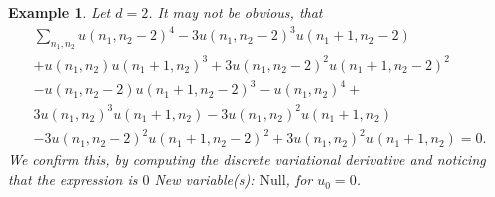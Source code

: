 \documentclass[sigconf,twocolumn]{acmart}
\newcommand{\1}{{\chi}}
\numberwithin{equation}{section}
\theoremstyle{thmlemcorr}
\numberwithin{theorem}{section}
\theoremstyle{thmlemcorr*}
\theoremstyle{defi}
\theoremstyle{remexample}
\newtheorem{example}[theorem]{Example}
\theoremstyle{ass}
\begin{document}
\begin{example}
	Let \(d=2\). It may not be obvious, that
	\begin{gather*}
		\sum_{n_1,n_2}u(n_1,n_2-2)^4 - 3 u(n_1,n_2-2)^3 u(n_1+1,n_2-2) \\+ 
		u(n_1,n_2) u(n_1+1,n_2)^3 + 3 u(n_1,n_2-2)^2 u(n_1+1,n_2-2)^2\\ -
		u(n_1,n_2-2) u(n_1+1,n_2-2)^3
		- u(n_1, n_2)^4 +\\
		3 u(n_1,n_2)^3 u(n_1+1,n_2)- 3 u(n_1,n_2)^2 u(n_1+1,n_2)\\
		-3 u(n_1,n_2-2)^2 u(n_1+1,n_2-2)^2+ 3 u(n_1,n_2)^2 u(n_1+1,n_2)=0.
	\end{gather*}
	We confirm this, by computing the discrete variational derivative and noticing that the expression is \(0\)
{\color{blue} New variable(s): \(\text{Null}\),  }
 for \(u_0=0\).
\end{example}
\end{document}
